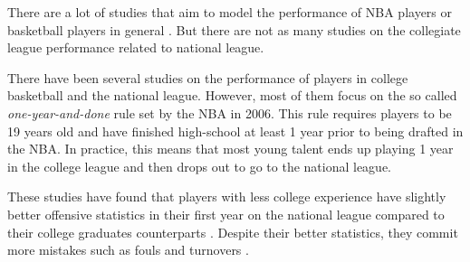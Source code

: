 There are a lot of studies that aim to model the performance of NBA players
or basketball players in general \cite{terner_modeling_2020,
casals_modelling_2013, kokanauskas_modelling_2021}.  But there are not as many
studies on the collegiate league performance related to national league.

There have been several studies on the performance of players in college
basketball and the national league. However, most of them focus on the so called
\emph{one-year-and-done} rule \cite{noauthor_nba_2006} set by the NBA in 2006.
This rule requires players to be 19 years old and have finished high-school at least
1 year prior to being drafted in the NBA. In practice, this means that most
young talent ends up playing 1 year in the college league and then drops out to
go to the national league.

These studies have found that players with less college experience have slightly
better offensive statistics in their first year on the national league compared to their
college graduates counterparts \cite{ashley_explaining_2017}. Despite their better statistics,
they commit more mistakes such as fouls and turnovers \cite{zestcott_one_2020}.

